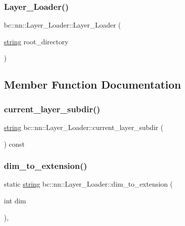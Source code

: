\subsubsection{\texorpdfstring{Layer\+\_\+\+Loader()}{Layer\_Loader()}}
{\footnotesize\ttfamily bc\+::nn\+::\+Layer\+\_\+\+Loader\+::\+Layer\+\_\+\+Loader (\begin{DoxyParamCaption}\item[{\hyperlink{structbc_1_1string}{string}}]{root\+\_\+directory }\end{DoxyParamCaption})\hspace{0.3cm}{\ttfamily [inline]}}



\subsection{Member Function Documentation}
\mbox{\label{structbc_1_1nn_1_1Layer__Loader_a16b97a62f8687323772d18f8ff2fb7ec}} 
\subsubsection{\texorpdfstring{current\+\_\+layer\+\_\+subdir()}{current\_layer\_subdir()}}
{\footnotesize\ttfamily \hyperlink{structbc_1_1string}{string} bc\+::nn\+::\+Layer\+\_\+\+Loader\+::current\+\_\+layer\+\_\+subdir (\begin{DoxyParamCaption}{ }\end{DoxyParamCaption}) const\hspace{0.3cm}{\ttfamily [inline]}}

\mbox{\label{structbc_1_1nn_1_1Layer__Loader_a94752be70d96b1f676a716b220da6075}} 
\subsubsection{\texorpdfstring{dim\+\_\+to\+\_\+extension()}{dim\_to\_extension()}}
{\footnotesize\ttfamily static \hyperlink{structbc_1_1string}{string} bc\+::nn\+::\+Layer\+\_\+\+Loader\+::dim\+\_\+to\+\_\+extension (\begin{DoxyParamCaption}\item[{int}]{dim }\end{DoxyParamCaption})\hspace{0.3cm}{\ttfamily [inline]}, {\ttfamily [static]}}


